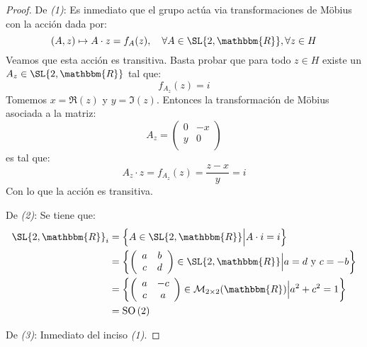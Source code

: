 \documentclass[12pt]{report}
\theoremstyle{largebreak}
\newcommand{\bbm}[1]{\ensuremath{\mathbbm{#1}}}
\newcommand{\SO}[1]{\ensuremath{\textup{SO}\left(#1\right)}}
\begin{document}
    \begin{proof}
        De \textit{(1)}: Es inmediato que el grupo actúa via transformaciones de Möbius con la acción dada por:
        \begin{equation*}
            (A,z)\mapsto A\cdot z = f_A(z),\quad\forall A\in \SL{2,\bbm{R}},\forall z\in H
        \end{equation*}
        Veamos que esta acción es transitiva. Basta probar que para todo $z\in H$ existe un $A_z\in\SL{2,\bbm{R}}$ tal que:
        \begin{equation*}
            f_{A_z}(z)=i
        \end{equation*}
        Tomemos $x=\Re(z)$ y $y=\Im(z)$. Entonces la transformación de Möbius asociada a la matriz:
        \begin{equation*}
            A_z=\left(
                \begin{array}{cc}
                    0 & -x \\
                    y & 0 \\
                \end{array}
            \right)
        \end{equation*}
        es tal que:
        \begin{equation*}
            A_z\cdot z=f_{ A_z}(z)=\frac{z-x}{y}=i
        \end{equation*}
        Con lo que la acción es transitiva.

        De \textit{(2)}: Se tiene que:
        \begin{equation*}
            \begin{split}
                \SL{2,\bbm{R}}_i&=\left\{A\in\SL{2,\bbm{R}}\Big|A\cdot i=i \right\}\\
                &=\left\{\left(\begin{array}{cc}
                    a & b \\
                    c & d \\
                \end{array} \right) \in\SL{2,\bbm{R}}\Big|a = d\textup{ y }c=-b \right\}\\
                &=\left\{\left(\begin{array}{cc}
                    a & -c \\
                    c & a \\
                \end{array} \right) \in\mathcal{M}_{2\times2}(\bbm{R}) \Big|a^2+c^2=1 \right\}\\
                &=\SO{2}\\
            \end{split}
        \end{equation*}

        De \textit{(3)}: Inmediato del inciso \textit{(1)}.
    \end{proof}
\end{document}

